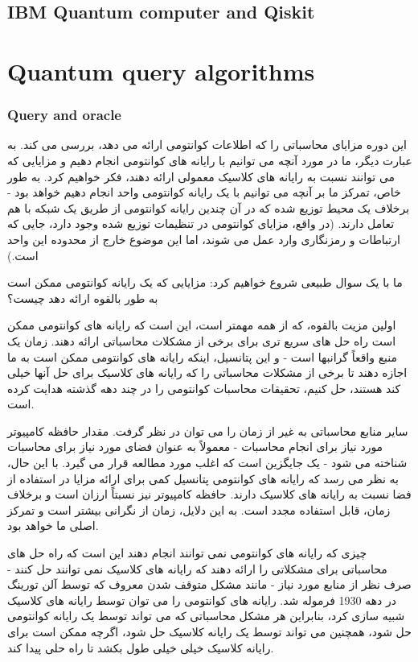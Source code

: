 \documentclass{book}
\begin{document}
\section{IBM Quantum computer and Qiskit}

\chapter{Quantum query algorithms}

\subsection{Query and oracle}	
	
این دوره مزایای محاسباتی را که اطلاعات کوانتومی ارائه می دهد، بررسی می کند. به عبارت دیگر، ما در مورد آنچه می توانیم با رایانه های کوانتومی انجام دهیم و مزایایی که می توانند نسبت به رایانه های کلاسیک معمولی ارائه دهند، فکر خواهیم کرد. به طور خاص، تمرکز ما بر آنچه می توانیم با یک رایانه کوانتومی واحد انجام دهیم خواهد بود - برخلاف یک محیط توزیع شده که در آن چندین رایانه کوانتومی از طریق یک شبکه با هم تعامل دارند. (در واقع، مزایای کوانتومی در تنظیمات توزیع شده وجود دارد، جایی که ارتباطات و رمزنگاری وارد عمل می شوند، اما این موضوع خارج از محدوده این واحد است.)

ما با یک سوال طبیعی شروع خواهیم کرد: مزایایی که یک رایانه کوانتومی ممکن است به طور بالقوه ارائه دهد چیست؟

اولین مزیت بالقوه، که از همه مهمتر است، این است که رایانه های کوانتومی ممکن است راه حل های سریع تری برای برخی از مشکلات محاسباتی ارائه دهند. زمان یک منبع واقعاً گرانبها است - و این پتانسیل، اینکه رایانه های کوانتومی ممکن است به ما اجازه دهند تا برخی از مشکلات محاسباتی را که رایانه های کلاسیک برای حل آنها خیلی کند هستند، حل کنیم، تحقیقات محاسبات کوانتومی را در چند دهه گذشته هدایت کرده است.

سایر منابع محاسباتی به غیر از زمان را می توان در نظر گرفت. مقدار حافظه کامپیوتر مورد نیاز برای انجام محاسبات - معمولاً به عنوان فضای مورد نیاز برای محاسبات شناخته می شود - یک جایگزین است که اغلب مورد مطالعه قرار می گیرد. با این حال، به نظر می رسد که رایانه های کوانتومی پتانسیل کمی برای ارائه مزایا در استفاده از فضا نسبت به رایانه های کلاسیک دارند. حافظه کامپیوتر نیز نسبتاً ارزان است و برخلاف زمان، قابل استفاده مجدد است. به این دلایل، زمان از نگرانی بیشتر است و تمرکز اصلی ما خواهد بود.

چیزی که رایانه های کوانتومی نمی توانند انجام دهند این است که راه حل های محاسباتی برای مشکلاتی را ارائه دهند که رایانه های کلاسیک نمی توانند حل کنند - صرف نظر از منابع مورد نیاز - مانند مشکل متوقف شدن معروف که توسط آلن تورینگ در دهه 1930 فرموله شد. رایانه های کوانتومی را می توان توسط رایانه های کلاسیک شبیه سازی کرد، بنابراین هر مشکل محاسباتی که می تواند توسط یک رایانه کوانتومی حل شود، همچنین می تواند توسط یک رایانه کلاسیک حل شود، اگرچه ممکن است برای رایانه کلاسیک خیلی خیلی طول بکشد تا راه حلی پیدا کند.
\end{document}
